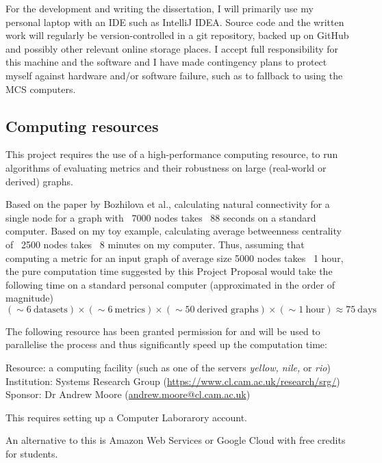 \documentclass[12pt,a4paper,twoside]{article}
\begin{document}
    For the development and writing the dissertation, I will primarily use my personal laptop with an IDE such as IntelliJ IDEA. Source code and the written work will regularly be version-controlled in a git repository, backed up on GitHub and possibly other relevant online storage places. I accept full responsibility for this machine and the software and I have made contingency plans to protect myself against hardware and/or software failure, such as to fallback to using the MCS computers.

    \subsection*{Computing resources}

    This project requires the use of a high-performance computing resource, to run algorithms of evaluating metrics and their robustness on large (real-world or derived) graphs.
    
    Based on the paper by Bozhilova et al., calculating natural connectivity for a single node for a graph with ~7000 nodes takes ~88 seconds on a standard computer. Based on my toy example, calculating average betweenness centrality of ~2500 nodes takes ~8 minutes on my computer. Thus, assuming that computing a metric for an input graph of average size 5000 nodes takes ~1 hour, the pure computation time suggested by this Project Proposal would take the following time on a standard personal computer (approximated in the order of magnitude)
    \[(\sim 6\ \text{datasets}) \times (\sim 6\ \text{metrics}) \times (\sim 50\ \text{derived graphs}) \times (\sim 1\ \text{hour}) \approx 75\ \text{days}\]
    
    The following resource has been granted permission for and will be used to parallelise the process and thus significantly speed up the computation time:
    
    \begin{adjustwidth}{1cm}{}
    	Resource: a computing facility (such as one of the servers \textit{yellow, nile,} or \textit{rio})\\
    	Institution: Systems Research Group (\url{https://www.cl.cam.ac.uk/research/srg/})\\
    	Sponsor: Dr Andrew Moore (\url{andrew.moore@cl.cam.ac.uk})
    	
    	This requires setting up a Computer Laborarory account.
	\end{adjustwidth}
    
    An alternative to this is Amazon Web Services or Google Cloud with free credits for students.
    
\end{document}

